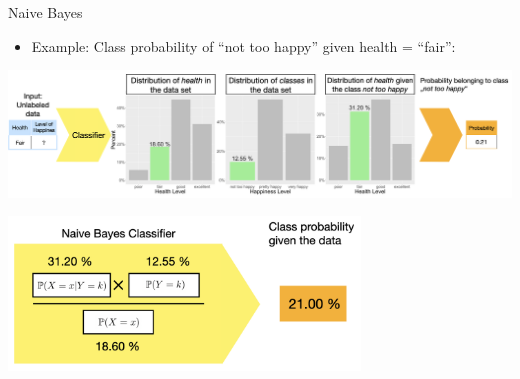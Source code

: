 \documentclass[11pt,compress,t,notes=noshow, xcolor=table]{beamer}
\begin{document}
\begin{vbframe}{Naive Bayes}
\newpage
\begin{itemize}
\item \small Example: Class probability of ``not too happy'' given health = ``fair'':
\end{itemize}
\begin{center}
  \includegraphics[width=1\textwidth]{figure_man/nutshell-classif-distributions-prediction.png}
\end{center}
\begin{center}
  \includegraphics[width=0.7\textwidth]{figure_man/nutshell-classif-naive-bayes-formula.png}
\end{center}

\end{vbframe}

\endlecture
\end{document}
